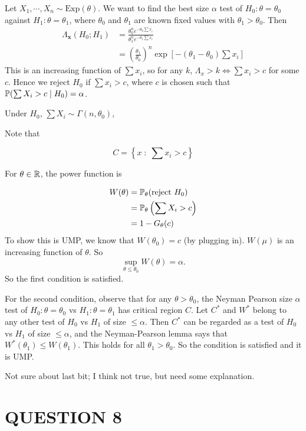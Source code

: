 \documentclass[a4paper]{article}
\begin{document}
Let $ X_{1},\cdots, X_{n} \sim  \text{Exp}(\theta) $.  We want to find the best size $\alpha$ test of $H_0: \theta = \theta_0$ against $H_1: \theta = \theta_1$, where $\theta_0$ and $\theta_1$ are known fixed values with $\theta_1 > \theta_0$. Then
\begin{align*}
\Lambda_\mathbf{x}(H_0; H_1) &= \frac{\theta_{0}^{n}e^{-\theta_{0}\sum x_{i}}}{\theta_{1}^{n}e^{-\theta_{1}\sum x_{i}}}\\
&= \left(  \frac{\theta_{1}}{\theta_{0}} \right)^{n} \exp \left[  -\left( \theta_{1} - \theta_{0} \right) \sum x_{i}  \right]   
\end{align*}
This is an increasing function of $\sum x_{i} $, so for any $k$, $\Lambda_x > k\Leftrightarrow \sum x_{i} > c$ for some $c$. Hence we reject $H_0$ if $\sum x_{i} > c$, where $c$ is chosen such that $\P(\sum X_{i} > c \mid H_0) = \alpha$.

Under $H_0$, $\sum X_{i} \sim \Gamma( n, \theta_{0} )$,  

Note that

\[ C = \left\{  x \; : \; \sum x_{i} > c  \right\}  \]

For $ \theta \in \R $, the power function is

\begin{align*}
W(\theta) &= \P_\theta(\text{reject } H_0)\\
&= \P_\theta\left(\sum X_{i} > c\right)\\
&= 1 - G_{\theta}(c)
\end{align*}
To show this is UMP, we know that $W(\theta_0) = c$ (by plugging in). $W(\mu)$ is an increasing function of $\theta$. So
\[
\sup_{ \theta \leq \theta_0} W(\theta) = \alpha.
\]
So the first condition is satisfied.

For the second condition, observe that for any $\theta > \theta_0$, the Neyman Pearson size $\alpha$ test of $H_0: \theta = \theta_{0} $ vs $H_1: \theta = \theta_{1} $ has critical region $C$. Let $C^*$ and $W^*$ belong to any other test of $H_0$ vs $H_1$ of size $\leq \alpha$. Then $C^*$ can be regarded as a test of $H_0$ vs $H_1$ of size $\leq \alpha$, and the Neyman-Pearson lemma says that $W^*(\theta_1) \leq W(\theta_1)$. This holds for all $\theta_1 > \theta_0$. So the condition is satisfied and it is UMP.
	
	
Not sure about last bit; I think not true, but need some explanation. 

\section{QUESTION 8}
\end{document}
